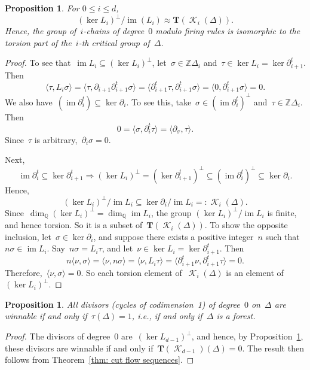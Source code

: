 \documentclass[12pt]{article}
\newcommand{\Z}{\mathbb{Z}}
\newcommand{\Q}{\mathbb{Q}}
\newcommand{\T}{\mathbf{T}}
\DeclareMathOperator{\im}{\mathrm{im}}
\DeclareMathOperator{\crit}{\mathcal{K}}
\newtheorem{prop}[theorem]{Proposition}
\theoremstyle{definition}
\theoremstyle{remark}
\begin{document}
\begin{prop}\label{prop: deg 0 iso} For $0\leq i\leq d$, 
\[
  (\ker L_i)^{\perp}/\im(L_i)\approx \T(\crit_i(\Delta)).
\]
Hence, the group of~$i$-chains of degree~$0$ modulo firing rules is
isomorphic to the torsion part of the~$i$-th critical group
of~$\Delta$.
\end{prop}
\begin{proof} 
  To see that~$\im L_i\subseteq(\ker L_i)^{\perp}$, let~$\sigma\in\Z\Delta_i$
  and~$\tau\in\ker L_i=\ker\partial_{i+1}^t$.  Then
  \[
    \langle \tau,L_i\sigma\rangle
    =\langle \tau,\partial_{i+1}\partial_{i+1}^t\sigma\rangle
    =\langle \partial_{i+1}^t\tau,\partial_{i+1}^t\sigma\rangle
    =\langle 0,\partial_{i+1}^t\sigma\rangle
    =0.
  \]
  We also have~$(\im \partial_i^t)\subseteq\ker\partial_i$.  To see
  this, take~$\sigma\in(\im\partial_i^t)^{\perp}$ and~$\tau\in\Z\Delta_i$.  Then
  \[
    0=\langle \sigma,\partial_i^t\tau\rangle=\langle\partial_\sigma,\tau\rangle.
  \]
  Since~$\tau$ is arbitrary,~$\partial_i\sigma=0$.

  Next, 
  \[
    \im\partial_{i}^t\subseteq\ker\partial_{i+1}^t
    \Rightarrow
   (\ker L_i)^{\perp}=(\ker\partial_{i+1}^t)^{\perp}\subseteq(\im\partial_i^t)^{\perp}\subseteq\ker\partial_i.
  \]
  Hence,
  \[
    (\ker L_i)^{\perp}/\im L_i\subseteq\ker\partial_i/\im L_i=:\crit_i(\Delta).
  \]
  Since~$\dim_{\Q}(\ker L_i)^{\perp}=\dim_{\Q}\im L_i$, the group $(\ker
  L_i)^{\perp}/\im L_i$ is finite, and hence torsion.  So it is a subset
  of~$\T(\crit_i(\Delta))$.  To show the opposite inclusion,
  let~$\sigma\in\ker\partial_i$, and suppose there exists a positive
  integer~$n$ such that~$n\sigma\in\im L_i$.  Say~$n\sigma=L_i\tau$, and
  let~$\nu\in\ker L_i=\ker\partial_{i+1}^t$.  Then
  \[
    n\langle \nu,\sigma\rangle
    =\langle \nu,n\sigma\rangle
    =\langle \nu,L_i\tau\rangle
    =\langle \partial_{i+1}^t\nu,\partial_{i+1}^t\tau\rangle
    =0.
  \]
  Therefore,~$\langle\nu,\sigma\rangle=0$. So each torsion element
  of~$\crit_i(\Delta)$ is an element of~$(\ker L_i)^{\perp}$.
\end{proof}

\begin{prop}\label{prop: degree 0 implies forest} All divisors (cycles of
  codimension~1) of degree~$0$ on~$\Delta$ are winnable if and only
  if~$\tau(\Delta)=1$, i.e., if and only if~$\Delta$ is a forest. 
\end{prop}
\begin{proof}  The divisors of degree~$0$ are~$(\ker L_{d-1})^{\perp}$, and
  hence, by Proposition~\ref{prop: deg 0 iso}, these divisors are winnable if
and only if~$\T(\crit_{d-1})(\Delta)=0$.  The result then follows from
Theorem~\ref{thm: cut flow sequences}.
\end{proof}
\end{document}
